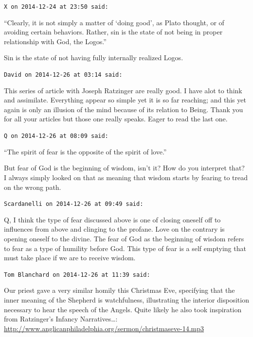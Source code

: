 \begin{footnotesize}\begin{sffamily}

\texttt{X on 2014-12-24 at 23:50 said:}

“Clearly, it is not simply a matter of `doing good’, as Plato thought, or of avoiding certain behaviors. Rather, sin is the state of not being in proper relationship with God, the Logos.”

Sin is the state of not having fully internally realized Logos.


\hfill

\texttt{David on 2014-12-26 at 03:14 said:}

This series of article with Joseph Ratzinger are really good. I have alot to think and assimilate. Everything appear so simple yet it is so far reaching; and this yet again is only an illusion of the mind because of its relation to Being. Thank you for all your articles but those one really speaks. Eager to read the last one.


\hfill

\texttt{Q on 2014-12-26 at 08:09 said:}

“The spirit of fear is the opposite of the spirit of love.”

But fear of God is the beginning of wisdom, isn't it? How do you interpret that? I always simply looked on that as meaning that wisdom starts by fearing to tread on the wrong path.


\hfill

\texttt{Scardanelli on 2014-12-26 at 09:49 said:}

Q, I think the type of fear discussed above is one of closing oneself off to influences from above and clinging to the profane. Love on the contrary is opening oneself to the divine. The fear of God as the beginning of wisdom refers to fear as a type of humility before God. This type of fear is a self emptying that must take place if we are to receive wisdom.


\hfill

\texttt{Tom Blanchard on 2014-12-26 at 11:39 said:}

Our priest gave a very similar homily this Christmas Eve, specifying that the inner meaning of the Shepherd is watchfulness, illustrating the interior disposition necessary to hear the speech of the Angels. Quite likely he also took inspiration from Ratzinger's Infancy Narratives…: \url{http://www.anglicanphiladelphia.org/sermon/christmaseve-14.mp3}



\end{sffamily}
\end{footnotesize}
